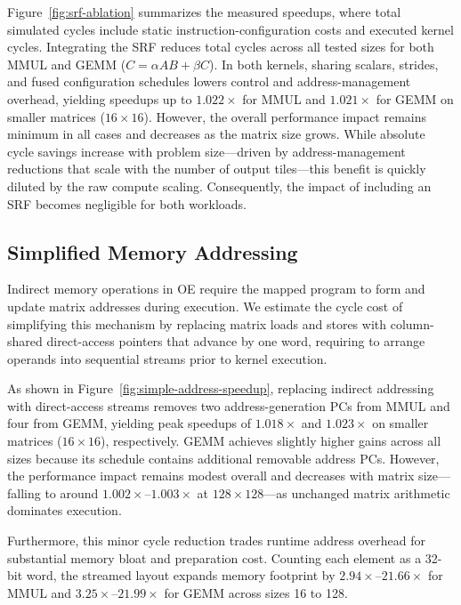 {Figure~\ref{fig:srf-ablation} summarizes the measured speedups, where total simulated cycles include static instruction-configuration costs and executed kernel cycles. Integrating the SRF reduces total cycles across all tested sizes for both MMUL and GEMM ($C = \alpha AB + \beta C$). In both kernels, sharing scalars, strides, and fused configuration schedules lowers control and address-management overhead, yielding speedups up to $1.022\times$ for MMUL and $1.021\times$ for GEMM on smaller matrices ($16\times16$). However, the overall performance impact remains minimum in all cases and decreases as the matrix size grows. While absolute cycle savings increase with problem size—driven by address-management reductions that scale with the number of output tiles—this benefit is quickly diluted by the raw compute scaling. Consequently, the impact of including an SRF becomes negligible for both workloads.

\subsection{Simplified Memory Addressing}
\label{subsec:simple-address}

Indirect memory operations in OE require the mapped program to form and update matrix addresses during execution. We estimate the cycle cost of simplifying this mechanism by replacing matrix loads and stores with column-shared direct-access pointers that advance by one word, requiring to arrange operands into sequential streams prior to kernel execution.

As shown in Figure~\ref{fig:simple-address-speedup}, replacing indirect addressing with direct-access streams removes two address-generation PCs from MMUL and four from GEMM, yielding peak speedups of $1.018\times$ and $1.023\times$ on smaller matrices ($16\times16$), respectively. GEMM achieves slightly higher gains across all sizes because its schedule contains additional removable address PCs. However, the performance impact remains modest overall and decreases with matrix size—falling to around $1.002\times$--$1.003\times$ at $128\times128$—as unchanged matrix arithmetic dominates execution.

Furthermore, this minor cycle reduction trades runtime address overhead for substantial memory bloat and preparation cost. Counting each element as a 32-bit word, the streamed layout expands memory footprint by $2.94\times$--$21.66\times$ for MMUL and $3.25\times$--$21.99\times$ for GEMM across sizes 16 to 128.

}
